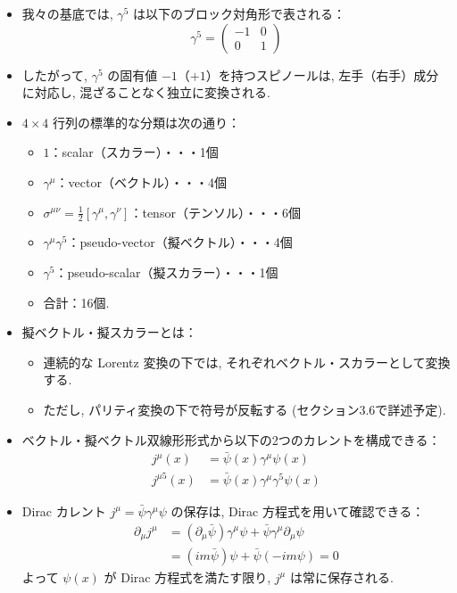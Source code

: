 \documentclass[a4paper,12pt]{article}
\begin{document}
\begin{itemize}
  \item 我々の基底では, $\gamma^5$ は以下のブロック対角形で表される：
  \begin{equation*}
    \gamma^5 =
    \begin{pmatrix}
    -1 & 0 \\
    0 & 1
  \end{pmatrix} \tag{3.72}
  \end{equation*}

  \item したがって, $\gamma^5$ の固有値 $-1$（$+1$）を持つスピノールは,
        左手（右手）成分に対応し, 混ざることなく独立に変換される.

  \item $4 \times 4$ 行列の標準的な分類は次の通り：
  \begin{itemize}
    \item $1$：scalar（スカラー）・・・1個
    \item $\gamma^\mu$：vector（ベクトル）・・・4個
    \item $\sigma^{\mu\nu} = \frac{1}{2}[\gamma^\mu, \gamma^\nu]$：tensor（テンソル）・・・6個
    \item $\gamma^\mu \gamma^5$：pseudo-vector（擬ベクトル）・・・4個
    \item $\gamma^5$：pseudo-scalar（擬スカラー）・・・1個
    \item 合計：16個.
  \end{itemize}

  \item 擬ベクトル・擬スカラーとは：
  \begin{itemize}
    \item 連続的な Lorentz 変換の下では, それぞれベクトル・スカラーとして変換する.
    \item ただし, パリティ変換の下で符号が反転する (セクション3.6で詳述予定).
  \end{itemize}

  \item ベクトル・擬ベクトル双線形形式から以下の2つのカレントを構成できる：
  \begin{align*}
    j^\mu(x) &= \bar{\psi}(x) \gamma^\mu \psi(x) \\
    j^{\mu5}(x) &= \bar{\psi}(x) \gamma^\mu \gamma^5 \psi(x) \tag{3.73}
  \end{align*} 
  \item Dirac カレント $j^\mu = \bar{\psi} \gamma^\mu \psi$ の保存は, Dirac 方程式を用いて確認できる：
  \begin{align*}
    \partial_\mu j^\mu &= (\partial_\mu \bar{\psi}) \gamma^\mu \psi + \bar{\psi} \gamma^\mu \partial_\mu \psi \\
    &= (im\bar{\psi}) \psi + \bar{\psi}(-im\psi) = 0 \tag{3.74}
  \end{align*}
  よって $\psi(x)$ が Dirac 方程式を満たす限り, $j^\mu$ は常に保存される.


\end{itemize}
\end{document}
